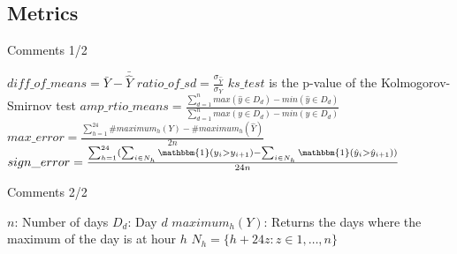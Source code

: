 \documentclass[xcolor=dvipsnames]{beamer}
\begin{document}
    \subsection{Metrics}
    \begin{frame}{}
    \end{frame}

    \begin{frame}{Comments 1/2}
        \begin{outline}
            \1 $diff\_of\_means = \bar{Y} - \bar{\hat{Y}}$
            \1 $ratio\_of\_sd = \frac{\sigma_{\hat{Y}}}{\sigma_{Y}}$    
            \1 $ks\_test$ is the p-value of the Kolmogorov-Smirnov test
            \1 $amp\_rtio\_means = \frac{\sum_{d=1}^{n} max({\hat{y} \in D_d}) - min({\hat{y} \in D_d})}{\sum_{d=1}^{n} max({y \in D_d}) - min({y \in D_d})}$
            \1 $max\_error = \frac{\sum_{h=1}^{24}\#maximum_h(Y) - \#maximum_h(\hat{Y})}{2n}$
            \1 $sign\_error = \frac{\sum_{h=1}^{24}(\sum_{i \in N_h}\mathbbm{1}(y_i > y_{i+1}) - \sum_{i \in N_h}\mathbbm{1}(\hat{y}_i > \hat{y}_{i+1}))}{24n}$    
        \end{outline}
    \end{frame}

    \begin{frame}{Comments 2/2}
        \begin{outline}
            \1 $n$: Number of days
            \1 $D_d$: Day $d$
            \1 $maximum_h(Y)$: Returns the days where the maximum of the day is at hour $h$
            \1 $N_h = \{h + 24z: z \in {1, \ldots, n}\}$
        \end{outline}
    \end{frame}
\end{document}
